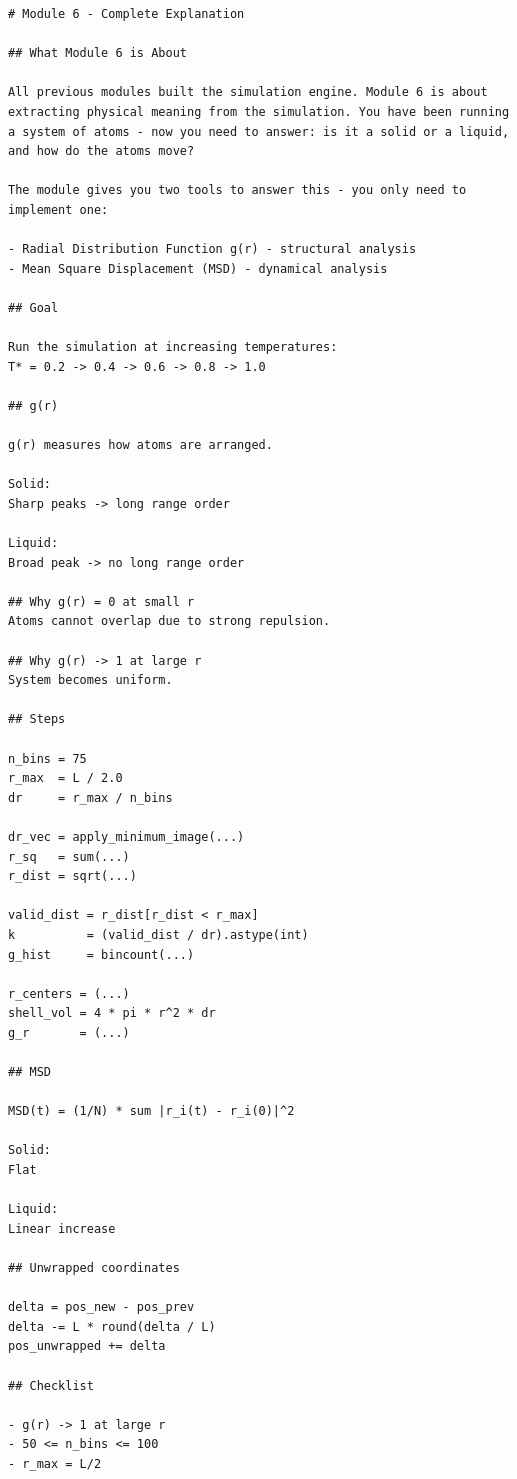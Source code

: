 \begin{lstlisting}
# Module 6 - Complete Explanation

## What Module 6 is About

All previous modules built the simulation engine. Module 6 is about extracting physical meaning from the simulation. You have been running a system of atoms - now you need to answer: is it a solid or a liquid, and how do the atoms move?

The module gives you two tools to answer this - you only need to implement one:

- Radial Distribution Function g(r) - structural analysis
- Mean Square Displacement (MSD) - dynamical analysis

## Goal

Run the simulation at increasing temperatures:
T* = 0.2 -> 0.4 -> 0.6 -> 0.8 -> 1.0

## g(r)

g(r) measures how atoms are arranged.

Solid:
Sharp peaks -> long range order

Liquid:
Broad peak -> no long range order

## Why g(r) = 0 at small r
Atoms cannot overlap due to strong repulsion.

## Why g(r) -> 1 at large r
System becomes uniform.

## Steps

n_bins = 75
r_max  = L / 2.0
dr     = r_max / n_bins

dr_vec = apply_minimum_image(...)
r_sq   = sum(...)
r_dist = sqrt(...)

valid_dist = r_dist[r_dist < r_max]
k          = (valid_dist / dr).astype(int)
g_hist     = bincount(...)

r_centers = (...)
shell_vol = 4 * pi * r^2 * dr
g_r       = (...)

## MSD

MSD(t) = (1/N) * sum |r_i(t) - r_i(0)|^2

Solid:
Flat

Liquid:
Linear increase

## Unwrapped coordinates

delta = pos_new - pos_prev
delta -= L * round(delta / L)
pos_unwrapped += delta

## Checklist

- g(r) -> 1 at large r
- 50 <= n_bins <= 100
- r_max = L/2
\end{lstlisting}

